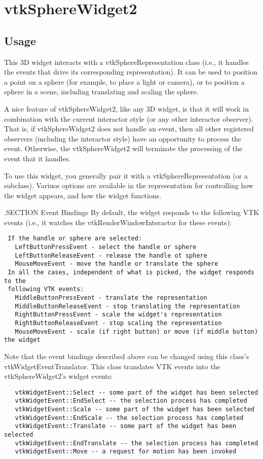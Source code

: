 \section{vtkSphereWidget2}

\subsection{Usage}

 This 3D widget interacts with a vtkSphereRepresentation class (i.e., it
 handles the events that drive its corresponding representation). It can be
 used to position a point on a sphere (for example, to place a light or
 camera), or to position a sphere in a scene, including translating and
 scaling the sphere.

 A nice feature of vtkSphereWidget2, like any 3D widget, is that it will
 work in combination with the current interactor style (or any other
 interactor observer). That is, if vtkSphereWidget2 does not handle an
 event, then all other registered observers (including the interactor
 style) have an opportunity to process the event. Otherwise, the
 vtkSphereWidget2 will terminate the processing of the event that it
 handles.

 To use this widget, you generally pair it with a vtkSphereRepresentation
 (or a subclass). Variuos options are available in the representation for
 controlling how the widget appears, and how the widget functions.

 .SECTION Event Bindings
 By default, the widget responds to the following VTK events (i.e., it
 watches the vtkRenderWindowInteractor for these events):
 \begin{verbatim}
 If the handle or sphere are selected:
   LeftButtonPressEvent - select the handle or sphere
   LeftButtonReleaseEvent - release the handle ot sphere
   MouseMoveEvent - move the handle or translate the sphere
 In all the cases, independent of what is picked, the widget responds to the 
 following VTK events:
   MiddleButtonPressEvent - translate the representation
   MiddleButtonReleaseEvent - stop translating the representation
   RightButtonPressEvent - scale the widget's representation
   RightButtonReleaseEvent - stop scaling the representation
   MouseMoveEvent - scale (if right button) or move (if middle button) the widget
 \end{verbatim}

 Note that the event bindings described above can be changed using this
 class's vtkWidgetEventTranslator. This class translates VTK events 
 into the vtkSphereWidget2's widget events:
 \begin{verbatim}
   vtkWidgetEvent::Select -- some part of the widget has been selected
   vtkWidgetEvent::EndSelect -- the selection process has completed
   vtkWidgetEvent::Scale -- some part of the widget has been selected
   vtkWidgetEvent::EndScale -- the selection process has completed
   vtkWidgetEvent::Translate -- some part of the widget has been selected
   vtkWidgetEvent::EndTranslate -- the selection process has completed
   vtkWidgetEvent::Move -- a request for motion has been invoked
 \end{verbatim}

